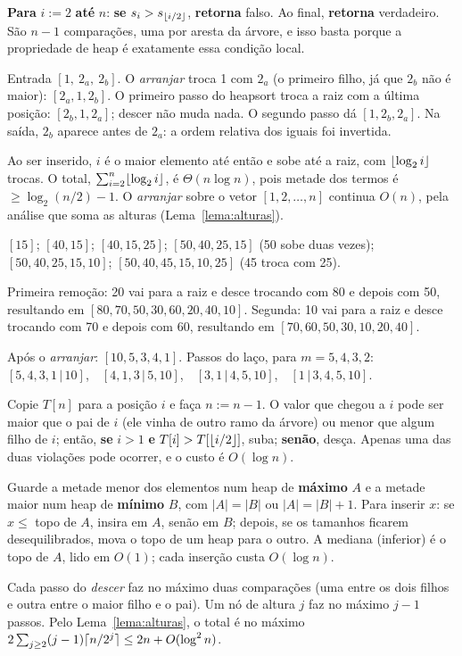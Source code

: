  \textbf{Para} $i:=2$ \textbf{até} $n$: \textbf{se} $s_i>s_{\lfloor i/2\rfloor}$, \textbf{retorna} falso. Ao final, \textbf{retorna} verdadeiro. São $n-1$ comparações, uma por aresta da árvore, e isso basta porque a propriedade de heap é exatamente essa condição local.

 Entrada $[1,\ 2_a,\ 2_b]$. O \emph{arranjar} troca 1 com $2_a$ (o primeiro filho, já que $2_b$ não é maior): $[2_a,1,2_b]$. O primeiro passo do heapsort troca a raiz com a última posição: $[2_b,1,2_a]$; descer não muda nada. O segundo passo dá $[1,2_b,2_a]$. Na saída, $2_b$ aparece antes de $2_a$: a ordem relativa dos iguais foi invertida.

 Ao ser inserido, $i$ é o maior elemento até então e sobe até a raiz, com $\lfloor\log_2i\rfloor$ trocas. O total, $\sum_{i=2}^n\lfloor\log_2i\rfloor$, é $\Theta(n\log n)$, pois metade dos termos é $\ge\log_2(n/2)-1$. O \emph{arranjar} sobre o vetor $[1,2,\dots,n]$ continua $O(n)$, pela análise que soma as alturas (Lema~\ref{lema:alturas}).

 $[15]$; $[40,15]$; $[40,15,25]$; $[50,40,25,15]$ (50 sobe duas vezes); $[50,40,25,15,10]$; $[50,40,45,15,10,25]$ (45 troca com 25).

 Primeira remoção: 20 vai para a raiz e desce trocando com 80 e depois com 50, resultando em $[80,70,50,30,\allowbreak60,20,40,10]$. Segunda: 10 vai para a raiz e desce trocando com 70 e depois com 60, resultando em $[70,60,50,30,\allowbreak10,20,40]$.

 Após o \emph{arranjar}: $[10,5,3,4,1]$. Passos do laço, para $m=5,4,3,2$:\\ $[5,4,3,1\,|\,10]$,\ \ $[4,1,3\,|\,5,10]$,\ \ $[3,1\,|\,4,5,10]$,\ \ $[1\,|\,3,4,5,10]$.

 Copie $T[n]$ para a posição $i$ e faça $n:=n-1$. O valor que chegou a $i$ pode ser maior que o pai de $i$ (ele vinha de outro ramo da árvore) ou menor que algum filho de $i$; então, \textbf{se} $i>1$ \textbf{e} $T[i]>T[\lfloor i/2\rfloor]$, suba; \textbf{senão}, desça. Apenas uma das duas violações pode ocorrer, e o custo é $O(\log n)$.

 Guarde a metade menor dos elementos num heap de \textbf{máximo} $A$ e a metade maior num heap de \textbf{mínimo} $B$, com $|A|=|B|$ ou $|A|=|B|+1$. Para inserir $x$: se $x\le$ topo de $A$, insira em $A$, senão em $B$; depois, se os tamanhos ficarem desequilibrados, mova o topo de um heap para o outro. A mediana (inferior) é o topo de $A$, lido em $O(1)$; cada inserção custa $O(\log n)$.

 Cada passo do \emph{descer} faz no máximo duas comparações (uma entre os dois filhos e outra entre o maior filho e o pai). Um nó de altura $j$ faz no máximo $j-1$ passos. Pelo Lema~\ref{lema:alturas}, o total é no máximo $2\sum_{j\ge2}(j-1)\lceil n/2^j\rceil\le2n+O(\log^2n)$.
